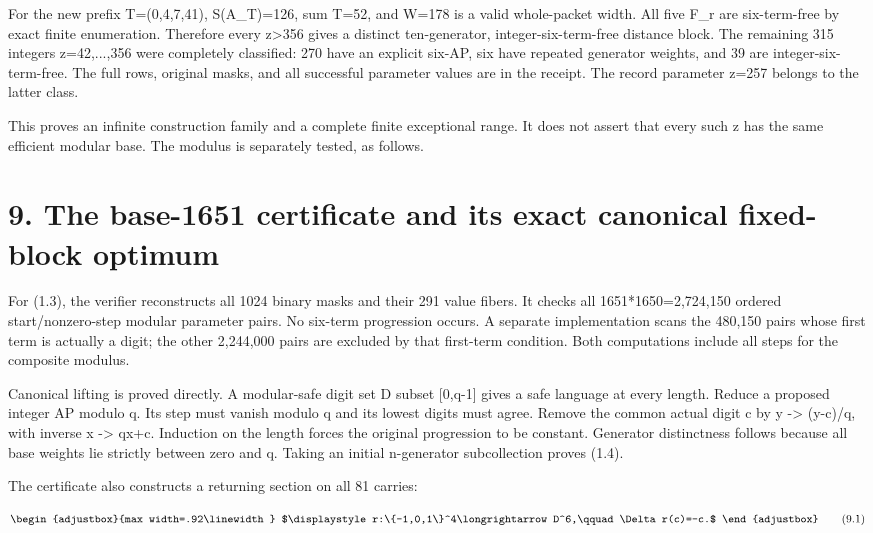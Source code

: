 For the new prefix T=(0,4,7,41), S(A\_T)=126, sum T=52, and W=178 is a valid whole-packet width. All five F\_r are six-term-free by exact finite enumeration. Therefore every z\textgreater356 gives a distinct ten-generator, integer-six-term-free distance block. The remaining 315 integers z=42,...,356 were completely classified: 270 have an explicit six-AP, six have repeated generator weights, and 39 are integer-six-term-free. The full rows, original masks, and all successful parameter values are in the receipt. The record parameter z=257 belongs to the latter class.

This proves an infinite construction family and a complete finite exceptional range. It does not assert that every such z has the same efficient modular base. The modulus is separately tested, as follows.

\section{9. The base-1651 certificate and its exact canonical fixed-block optimum}\label{n08-the-base-1651-certificate-and-its-exact-canonical-fixed-block-optimum}

For (1.3), the verifier reconstructs all 1024 binary masks and their 291 value fibers. It checks all 1651*1650=2,724,150 ordered start/nonzero-step modular parameter pairs. No six-term progression occurs. A separate implementation scans the 480,150 pairs whose first term is actually a digit; the other 2,244,000 pairs are excluded by that first-term condition. Both computations include all steps for the composite modulus.

Canonical lifting is proved directly. A modular-safe digit set D subset {[}0,q-1{]} gives a safe language at every length. Reduce a proposed integer AP modulo q. Its step must vanish modulo q and its lowest digits must agree. Remove the common actual digit c by y -\textgreater{} (y-c)/q, with inverse x -\textgreater{} qx+c. Induction on the length forces the original progression to be constant. Generator distinctness follows because all base weights lie strictly between zero and q. Taking an initial n-generator subcollection proves (1.4).

The certificate also constructs a returning section on all 81 carries:

\[
\begin{adjustbox}{max width=.92\linewidth}
$\displaystyle r:\{-1,0,1\}^4\longrightarrow D^6,\qquad\Delta r(c)=-c.$
\end{adjustbox}
\tag{9.1}
\]

